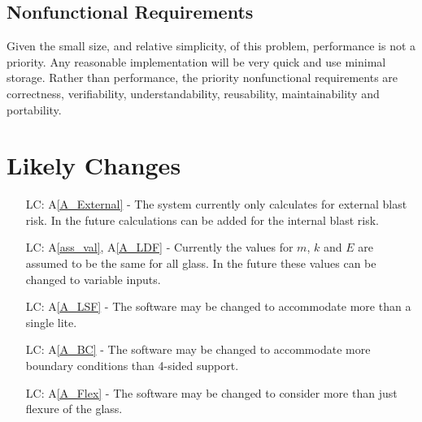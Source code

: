 \documentclass[12pt]{article}
\newcommand{\aref}[1]{A\ref{#1}}
\newcounter{lcnum} %
\begin{document}
\subsection{Nonfunctional Requirements}

Given the small size, and relative simplicity, of this problem, performance is
not a priority.  Any reasonable implementation will be very quick and use
minimal storage.  Rather than performance, the priority nonfunctional
requirements are correctness, verifiability, understandability, reusability, 
maintainability and portability.

\section{Likely Changes}    

\noindent \begin{itemize}

\item[LC\refstepcounter{lcnum}\thelcnum\label{LC_int}:] \aref{A_External} - The
  system currently only calculates for external blast risk. In the future
  calculations can be added for the internal blast risk.


\item[LC\refstepcounter{lcnum}\thelcnum\label{LC_variables}:] \aref{ass_val},
  \aref{A_LDF} - Currently the values for $m$, $k$ and $E$ are assumed to be the
  same for all glass.  In the future these values can be changed to variable
  inputs.

\item[LC\refstepcounter{lcnum}\thelcnum\label{LC_lite}:] \aref{A_LSF} - The
  software may be changed to accommodate more than a single lite.

\item[LC\refstepcounter{lcnum}\thelcnum\label{LC_BC}:] \aref{A_BC} - The
  software may be changed to accommodate more boundary conditions than 4-sided
  support.

\item[LC\refstepcounter{lcnum}\thelcnum\label{LC_Flex}:] \aref{A_Flex} - The
  software may be changed to consider more than just flexure of the glass.


\end{itemize}
\end{document}
